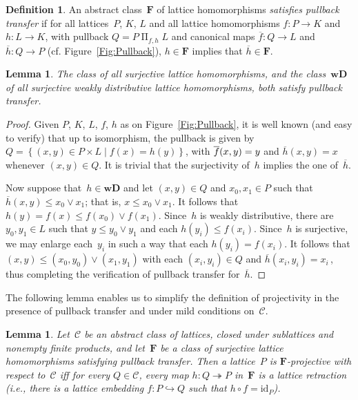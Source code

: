 \documentclass[reqno]{amsart}
\numberwithin{equation}{section}
\theoremstyle{plain}
\newtheorem{lemma}[theorem]{Lemma}
\theoremstyle{definition}
\newtheorem{definition}[theorem]{Definition}
\theoremstyle{remark}
\numberwithin{figure}{section}
\numberwithin{table}{section}
\begin{document}
\begin{definition}\label{D:PullTransf}
An abstract class~${\mathbf{F}}$ of lattice homomorphisms \emph{satisfies pullback transfer} if for all lattices~$P$, $K$, $L$ and all lattice homomorphisms $f\colon P\to K$ and $h\colon L\to K$, with pullback $Q=P\mathbin{\Pi}_{f,h}L$ and canonical maps ${\overline{{f}}}\colon Q\to L$ and ${\overline{{h}}}\colon Q\to P$ (cf. Figure~\ref{Fig:Pullback}), $h\in{\mathbf{F}}$ implies that ${\overline{{h}}}\in{\mathbf{F}}$.
\end{definition}

\begin{lemma}\label{L:WD2PullTransf}
The class of all surjective lattice homomorphisms, and the class~${\mathbf{wD}}$ of all surjective weakly distributive lattice homomorphisms, both satisfy pullback transfer.
\end{lemma}

\begin{proof}
Given $P$, $K$, $L$, $f$, $h$ as on Figure~\ref{Fig:Pullback}, it is well known (and easy to verify) that up to isomorphism, the pullback is given by $Q={{\left\{{{{(x,y)\in P\times L}}\mid{{f(x)=h(y)}}}\right\}}}$, with ${\overline{{f}}}(x,y)=\nobreak y$ and ${\overline{{h}}}(x,y)=x$ whenever $(x,y)\in Q$.
It is trivial that the surjectivity of~$h$ implies the one of~${\overline{{h}}}$.

Now suppose that~$h\in{\mathbf{wD}}$ and let $(x,y)\in Q$ and $x_0,x_1\in P$ such that ${\overline{{h}}}(x,y)\leq x_0\vee x_1$; that is, $x\leq x_0\vee x_1$.
It follows that $h(y)=f(x)\leq f(x_0)\vee f(x_1)$.
Since~$h$ is weakly distributive, there are $y_0,y_1\in L$ such that $y\leq y_0\vee y_1$ and each $h(y_i)\leq f(x_i)$.
Since~$h$ is surjective, we may enlarge each~$y_i$ in such a way that each $h(y_i)=f(x_i)$.
It follows that $(x,y)\leq(x_0,y_0)\vee(x_1,y_1)$ with each $(x_i,y_i)\in Q$ and ${\overline{{h}}}(x_i,y_i)=x_i$\,, thus completing the verification of pullback transfer for~${\overline{{h}}}$.
\end{proof}

The following lemma enables us to simplify the definition of projectivity in the presence of pullback transfer and under mild conditions on~${\mathcal{C}}$.

\begin{lemma}\label{D:PullTransfProj}
Let~${\mathcal{C}}$ be an abstract class of lattices, closed under sublattices and nonempty finite products, and let~${\mathbf{F}}$ be a class of surjective lattice homomorphisms satisfying pullback transfer.
Then a lattice~$P$ is ${\mathbf{F}}$-projective with respect to~${\mathcal{C}}$ if{f} for every $Q\in{\mathcal{C}}$, every map $h\colon Q\twoheadrightarrow P$ in~${\mathbf{F}}$ is a lattice retraction {\textup{(}{{i.e., there is a lattice embedding $f\colon P\hookrightarrow Q$ such that $h\circ f={\mathrm{id}}_P$}}\textup{)}}.
\end{lemma}
\end{document}
